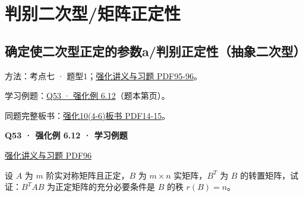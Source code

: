 \documentclass[UTF8,fontset=fandol,11pt,a4paper]{ctexart}
\newcommand{\source}[1]{{\footnotesize\color{Muted}#1\par}}
\newcommand{\qtitle}[2]{\par\needspace{5\baselineskip}\hypertarget{#1}{}\label{#1}\textbf{#2}\par}
\begin{document}
\section*{判别二次型/矩阵正定性}
\subsection*{确定使二次型正定的参数a/判别正定性（抽象二次型）}
\hypertarget{node-E1}{}
方法：考点七 · 题型1；\href{file:///Users/skyintelligence/Desktop/\%E5\%BE\%97\%E8\%AF\%BB\%E4\%B8\%AA\%E7\%A0\%94-\%E5\%8C\%97\%E5\%A4\%A7\%E8\%BD\%AF\%E5\%BE\%AE/\%E6\%95\%B0\%E5\%AD\%A6\%20150/Kira\%C2\%B727\%E7\%BA\%BF\%E6\%80\%A7\%E4\%BB\%A3\%E6\%95\%B0\%E5\%BC\%BA\%E5\%8C\%96\%E8\%AE\%B2\%E4\%B9\%89\%2B\%E4\%B9\%A0\%E9\%A2\%98.pdf\#page=95}{强化讲义与习题 PDF95-96}。\par
学习例题：\hyperlink{R-EX-12}{Q53 · 强化例 6.12}（题本第\pageref*{R-EX-12}页）。\par
同题完整板书：\href{file:///Users/skyintelligence/Desktop/\%E5\%BE\%97\%E8\%AF\%BB\%E4\%B8\%AA\%E7\%A0\%94-\%E5\%8C\%97\%E5\%A4\%A7\%E8\%BD\%AF\%E5\%BE\%AE/\%E6\%95\%B0\%E5\%AD\%A6\%20150/\%E7\%BA\%BF\%E6\%80\%A7\%E4\%BB\%A3\%E6\%95\%B0/\%E7\%BA\%BF\%E4\%BB\%A3\%E5\%BC\%BA\%E5\%8C\%9610\%284-6\%29\%20\%20\%E7\%AC\%AC\%E5\%85\%AD\%E7\%AB\%A0\%20\%E4\%BA\%8C\%E6\%AC\%A1\%E5\%9E\%8B2\%E3\%80\%90\%E4\%BE\%8B6.5\%E3\%80\%91-\%E3\%80\%90\%E4\%BE\%8B6.13\%E3\%80\%91.pdf\#page=14}{强化10(4-6)板书 PDF14-15}。\par
\vspace{3mm}
\begin{minipage}{\linewidth}
\qtitle{R-EX-12}{Q53 · 强化例 6.12 · 学习例题}
\source{\href{file:///Users/skyintelligence/Desktop/\%E5\%BE\%97\%E8\%AF\%BB\%E4\%B8\%AA\%E7\%A0\%94-\%E5\%8C\%97\%E5\%A4\%A7\%E8\%BD\%AF\%E5\%BE\%AE/\%E6\%95\%B0\%E5\%AD\%A6\%20150/Kira\%C2\%B727\%E7\%BA\%BF\%E6\%80\%A7\%E4\%BB\%A3\%E6\%95\%B0\%E5\%BC\%BA\%E5\%8C\%96\%E8\%AE\%B2\%E4\%B9\%89\%2B\%E4\%B9\%A0\%E9\%A2\%98.pdf\#page=96}{强化讲义与习题 PDF96}}
设 $A$ 为 $m$ 阶实对称矩阵且正定，$B$ 为 $m\times n$ 实矩阵，$B^T$ 为 $B$ 的转置矩阵，试证：$B^TAB$ 为正定矩阵的充分必要条件是 $B$ 的秩 $r(B)=n$。
\end{minipage}\par\vspace{7mm}
\end{document}
